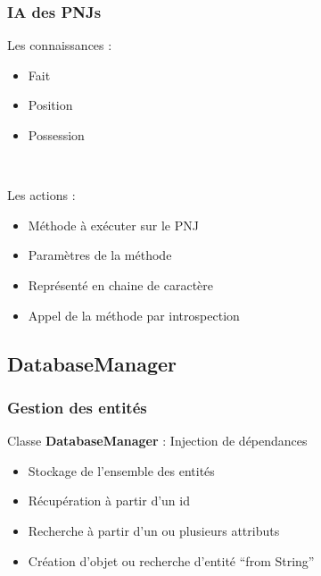\documentclass{beamer}
\begin{document}
\begin{frame}
  \frametitle{IA des PNJs}
  Les connaissances :
  \begin{itemize}
  \item Fait
  \item Position
  \item Possession
  \end{itemize}
  ~\\
\end{frame}

\begin{frame}
  Les actions :
  \begin{itemize}
  \item Méthode à exécuter sur le PNJ
  \item Paramètres de la méthode
  \item Représenté en chaine de caractère
  \item Appel de la méthode par introspection
  \end{itemize}
\end{frame}

\subsection{DatabaseManager}
\begin{frame}
  \frametitle{Gestion des entités}
  Classe \textbf{DatabaseManager} : Injection de dépendances
  \begin{itemize}
  \item Stockage de l'ensemble des entités
  \item Récupération à partir d'un id
  \item Recherche à partir d'un ou plusieurs attributs
  \item Création d'objet ou recherche d'entité ``from String''
  \end{itemize}
\end{frame}

\author{RIVOIRE Claire}
\end{document}
